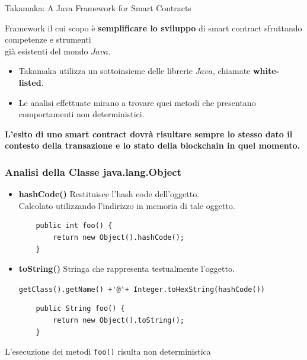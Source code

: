 \documentclass[]{beamer}
\begin{document}

\begin{frame}{Takamaka: A Java Framework for Smart Contracts}
	
	\begin{center}
		Framework il cui scopo è \textbf{semplificare lo sviluppo} di smart contract sfruttando competenze e strumenti\\già esistenti del mondo $Java$.
	\end{center}
	
	\begin{block}{}
		\begin{itemize}
			\item Takamaka utilizza un sottoinsieme delle librerie $Java$, chiamate \textbf{white-listed}.
			\item Le analisi effettuate mirano a trovare quei metodi che presentano comportamenti non deterministici.
		\end{itemize}
		 
	\end{block}
	\begin{center}
		\textbf{L'esito di uno smart contract dovrà risultare sempre lo stesso dato il contesto della transazione e lo stato della blockchain in quel momento.}
	\end{center}
\end{frame}

\begin{frame}[fragile]
	\frametitle{Analisi della Classe java.lang.Object}
	\begin{block}{}
		\begin{itemize}
			\item \textbf{hashCode()} Restituisce l'hash code dell'oggetto.\\
			Calcolato utilizzando l'indirizzo in memoria di tale oggetto.
			\begin{lstlisting}
	public int foo() {
		return new Object().hashCode();
	}
			\end{lstlisting}
		\end{itemize}
	\end{block}
	\begin{block}{}
		\begin{itemize}
			\item \textbf{toString()} Stringa che rappresenta testualmente l'oggetto.
			
			\lstinline|getClass().getName() +'@'+ Integer.toHexString(hashCode())|
			\begin{lstlisting}
	public String foo() {
		return new Object().toString();
	}
			\end{lstlisting}
		\end{itemize}
	\end{block}
	\begin{center}
		L'esecuzione dei metodi \lstinline|foo()| risulta non deterministica
	\end{center}
\end{frame}
\end{document}
